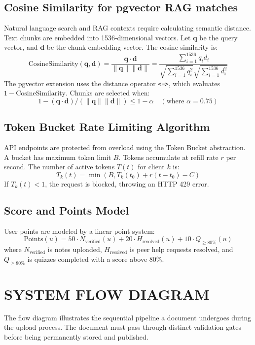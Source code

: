 \documentclass[12,Times new Roman,a4paper]{report}
\begin{document}
\subsection{Cosine Similarity for pgvector RAG matches}
Natural language search and RAG contexts require calculating semantic distance. Text chunks are embedded into 1536-dimensional vectors. Let $\mathbf{q}$ be the query vector, and $\mathbf{d}$ be the chunk embedding vector. The cosine similarity is:
\begin{equation}
\text{CosineSimilarity}(\mathbf{q}, \mathbf{d}) = \frac{\mathbf{q} \cdot \mathbf{d}}{\|\mathbf{q}\| \|\mathbf{d}\|} = \frac{\sum_{i=1}^{1536} q_i d_i}{\sqrt{\sum_{i=1}^{1536} q_i^2} \sqrt{\sum_{i=1}^{1536} d_i^2}}
\end{equation}
The pgvector extension uses the distance operator \texttt{<=>}, which evaluates $1 - \text{CosineSimilarity}$. Chunks are selected when:
\begin{equation}
1 - (\mathbf{q} \cdot \mathbf{d}) / (\|\mathbf{q}\| \|\mathbf{d}\|) \le 1 - \alpha \quad (\text{where } \alpha = 0.75)
\end{equation}

\subsection{Token Bucket Rate Limiting Algorithm}
API endpoints are protected from overload using the Token Bucket abstraction. A bucket has maximum token limit $B$. Tokens accumulate at refill rate $r$ per second. The number of active tokens $T(t)$ for client $k$ is:
\begin{equation}
T_k(t) = \min(B, T_k(t_0) + r(t - t_0) - C)
\end{equation}
If $T_k(t) < 1$, the request is blocked, throwing an HTTP 429 error.

\subsection{Score and Points Model}
User points are modeled by a linear point system:
\begin{equation}
\text{Points}(u) = 50 \cdot N_{\text{verified}}(u) + 20 \cdot H_{\text{resolved}}(u) + 10 \cdot Q_{\ge 80\%}(u)
\end{equation}
where $N_{\text{verified}}$ is notes uploaded, $H_{\text{resolved}}$ is peer help requests resolved, and $Q_{\ge 80\%}$ is quizzes completed with a score above 80\%.

\section{SYSTEM FLOW DIAGRAM}
The flow diagram illustrates the sequential pipeline a document undergoes during the upload process. The document must pass through distinct validation gates before being permanently stored and published.
\end{document}
